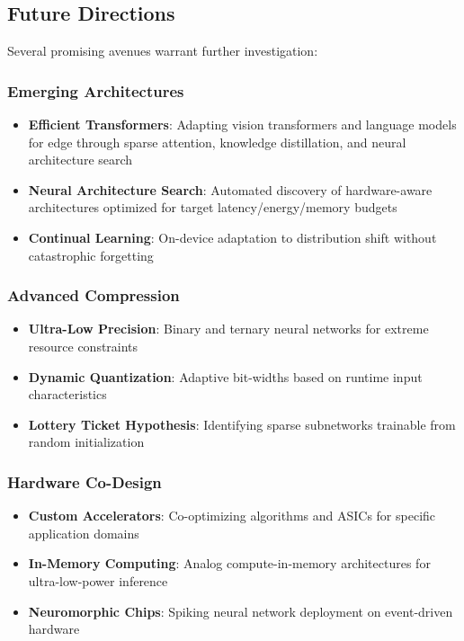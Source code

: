 \subsection{Future Directions}

Several promising avenues warrant further investigation:

\subsubsection{Emerging Architectures}
\begin{itemize}
\item \textbf{Efficient Transformers}: Adapting vision transformers and language models for edge through sparse attention, knowledge distillation, and neural architecture search
\item \textbf{Neural Architecture Search}: Automated discovery of hardware-aware architectures optimized for target latency/energy/memory budgets
\item \textbf{Continual Learning}: On-device adaptation to distribution shift without catastrophic forgetting
\end{itemize}

\subsubsection{Advanced Compression}
\begin{itemize}
\item \textbf{Ultra-Low Precision}: Binary and ternary neural networks for extreme resource constraints
\item \textbf{Dynamic Quantization}: Adaptive bit-widths based on runtime input characteristics
\item \textbf{Lottery Ticket Hypothesis}: Identifying sparse subnetworks trainable from random initialization
\end{itemize}

\subsubsection{Hardware Co-Design}
\begin{itemize}
\item \textbf{Custom Accelerators}: Co-optimizing algorithms and ASICs for specific application domains
\item \textbf{In-Memory Computing}: Analog compute-in-memory architectures for ultra-low-power inference
\item \textbf{Neuromorphic Chips}: Spiking neural network deployment on event-driven hardware
\end{itemize}

